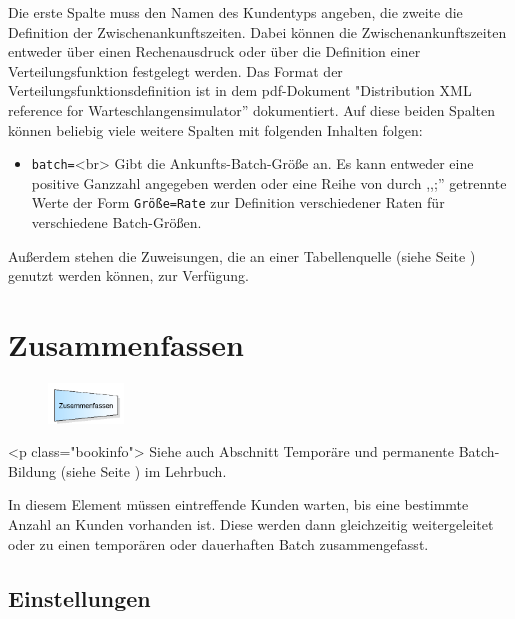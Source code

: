 Die erste Spalte muss den Namen des Kundentyps angeben, die zweite die Definition der Zwischenankunftszeiten.
Dabei können die Zwischenankunftszeiten entweder über einen Rechenausdruck oder über die Definition einer
Verteilungsfunktion festgelegt werden. Das Format der Verteilungsfunktionsdefinition ist in dem pdf-Dokument
"Distribution XML reference for Warteschlangensimulator'' dokumentiert. Auf diese beiden Spalten können beliebig
viele weitere Spalten mit folgenden Inhalten folgen:

\begin{itemize}
  \item \texttt{batch=}<br>
  Gibt die Ankunfts-Batch-Größe an. Es kann entweder eine positive Ganzzahl angegeben werden oder eine Reihe von
  durch ,,;'' getrennte Werte der Form \texttt{Größe=Rate} zur Definition verschiedener Raten für verschiedene Batch-Größen. 
\end{itemize}

Außerdem stehen die Zuweisungen, die an einer Tabellenquelle (siehe Seite \pageref{ref:ModelElementSourceTable}) genutzt werden können, zur Verfügung.


\section{Zusammenfassen}
\label{ref:ModelElementBatch}

\begin{figure}
\vspace{-22pt}
\includegraphics[width=2cm]{imageModelElementBatch.png}
\vspace{-22pt}
\end{figure}

<p class="bookinfo">
Siehe auch Abschnitt Temporäre und permanente Batch-Bildung (siehe Seite \pageref{ref:book:8.2.5}) im Lehrbuch.

In diesem Element müssen eintreffende Kunden warten, bis eine bestimmte Anzahl an Kunden vorhanden ist.
Diese werden dann gleichzeitig weitergeleitet oder zu einen temporären oder dauerhaften Batch zusammengefasst.

\subsection*{Einstellungen}

